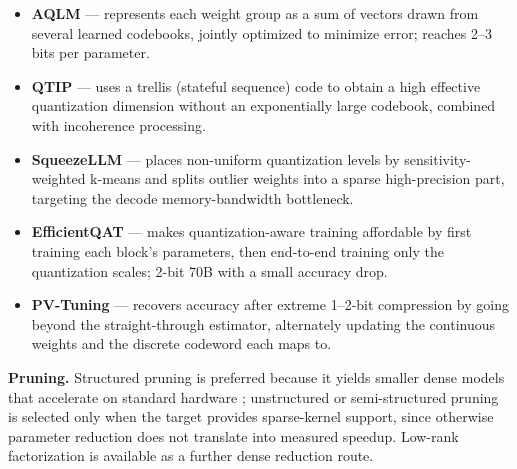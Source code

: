 \begin{itemize}
  \item \textbf{AQLM} \cite{egiazarian2024aqlm} --- represents each weight group as a sum of vectors drawn from several learned codebooks, jointly optimized to minimize error; reaches 2--3 bits per parameter.

  \item \textbf{QTIP} \cite{tseng2024qtip} --- uses a trellis (stateful sequence) code to obtain a high effective quantization dimension without an exponentially large codebook, combined with incoherence processing.

  \item \textbf{SqueezeLLM} \cite{kim2024squeezellm} --- places non-uniform quantization levels by sensitivity-weighted k-means and splits outlier weights into a sparse high-precision part, targeting the decode memory-bandwidth bottleneck.

  \item \textbf{EfficientQAT} \cite{chen2025efficientqat} --- makes quantization-aware training affordable by first training each block's parameters, then end-to-end training only the quantization scales; 2-bit 70B with a small accuracy drop.

  \item \textbf{PV-Tuning} \cite{malinovskii2024pvtuning} --- recovers accuracy after extreme 1--2-bit compression by going beyond the straight-through estimator, alternately updating the continuous weights and the discrete codeword each maps to.

\end{itemize}

\textbf{Pruning.} Structured pruning is preferred because it yields smaller dense models that accelerate on standard hardware \cite{ma2023llmpruner,ashkboos2024slicegpt,men2024shortgpt}; unstructured or semi-structured pruning \cite{frantar2023sparsegpt,sun2024wanda} is selected only when the target provides sparse-kernel support, since otherwise parameter reduction does not translate into measured speedup. Low-rank factorization \cite{wang2025svdllm} is available as a further dense reduction route.

